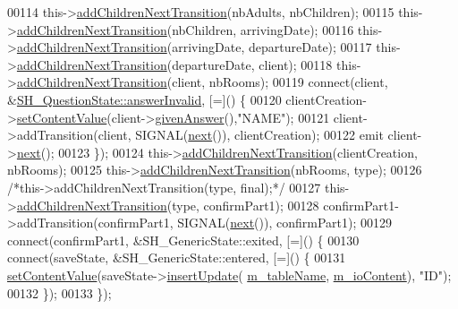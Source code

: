 \begin{DoxyCode}
00114     this->\hyperlink{classSH__InOutStateMachine_a689e5513ef6ef3fc1598efacd413372e}{addChildrenNextTransition}(nbAdults, nbChildren);
00115     this->\hyperlink{classSH__InOutStateMachine_a689e5513ef6ef3fc1598efacd413372e}{addChildrenNextTransition}(nbChildren, arrivingDate);
00116     this->\hyperlink{classSH__InOutStateMachine_a689e5513ef6ef3fc1598efacd413372e}{addChildrenNextTransition}(arrivingDate, departureDate);
00117     this->\hyperlink{classSH__InOutStateMachine_a689e5513ef6ef3fc1598efacd413372e}{addChildrenNextTransition}(departureDate, client);
00118     this->\hyperlink{classSH__InOutStateMachine_a689e5513ef6ef3fc1598efacd413372e}{addChildrenNextTransition}(client, nbRooms);
00119     connect(client, &\hyperlink{classSH__QuestionState_a3348a8a683130678ac87a10ba2a25486}{SH\_QuestionState::answerInvalid}, [=]() \{
00120         clientCreation->\hyperlink{classSH__InOutStateMachine_aa2766b7a7ba39c35a10df7fc0c151b4f}{setContentValue}(client->\hyperlink{classSH__QuestionState_abde97c61175be95358ece622fd16593e}{givenAnswer}(),\textcolor{stringliteral}{"NAME"});
00121         client->addTransition(client, SIGNAL(\hyperlink{classSH__InOutStateMachine_aa9ee51efe0e17dcf5366c8a97b523892}{next}()), clientCreation);
00122         emit client->\hyperlink{classSH__GenericState_a030e67a872956135c52e6876d960a7b5}{next}();
00123     \});
00124     this->\hyperlink{classSH__InOutStateMachine_a689e5513ef6ef3fc1598efacd413372e}{addChildrenNextTransition}(clientCreation, nbRooms);
00125     this->\hyperlink{classSH__InOutStateMachine_a689e5513ef6ef3fc1598efacd413372e}{addChildrenNextTransition}(nbRooms, type);
00126     \textcolor{comment}{/*this->addChildrenNextTransition(type, final);*/}
00127     this->\hyperlink{classSH__InOutStateMachine_a689e5513ef6ef3fc1598efacd413372e}{addChildrenNextTransition}(type, confirmPart1);
00128     confirmPart1->addTransition(confirmPart1, SIGNAL(\hyperlink{classSH__InOutStateMachine_aa9ee51efe0e17dcf5366c8a97b523892}{next}()), confirmPart1);
00129     connect(confirmPart1, &SH\_GenericState::exited, [=]() \{
00130         connect(saveState, &SH\_GenericState::entered, [=]() \{
00131             \hyperlink{classSH__InOutStateMachine_aa2766b7a7ba39c35a10df7fc0c151b4f}{setContentValue}(saveState->\hyperlink{classSH__AdaptDatabaseState_ab010e64da052db416328d3bcb9ca01d4}{insertUpdate}(
      \hyperlink{classSH__InOutStateMachine_acc0f5d5133af2dcca30939f53ec8837b}{m\_tableName}, \hyperlink{classSH__InOutStateMachine_a661a1c7bd3b1086b3b5cd60ca957ecbd}{m\_ioContent}), \textcolor{stringliteral}{"ID"});
00132         \});
00133     \});

\end{DoxyCode}
